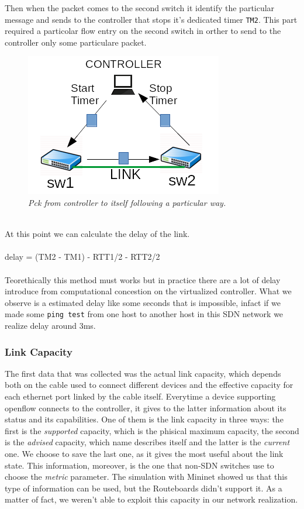 \documentclass[conference,10pt]{IEEEtran}
\begin{document}
Then when the packet comes to the second switch it identify the particular message and sends to the controller that stops it's dedicated timer \texttt{TM2}.
\newline This part required a particolar flow entry on the second switch in orther to send to the controller only some particulare packet.
\begin{figure}[!h]
 \centering
 \includegraphics[scale=0.70]{images/rtt1.png}
 \caption{\emph{Pck from controller to itself following a particular way.}}
 \label{fig:topo}
\end{figure}
\\
\newline At this point we can calculate the delay of the link.
\\
\\
 delay = (TM2 - TM1) - RTT1/2 - RTT2/2
\\
\\
Teorethically this method must works but in practice there are a lot of delay introduce from computational concestion on the virtualized controller.
What we observe is a estimated delay like some seconds that is impossible, infact if we made some \texttt{ping test} from one host to another host
in this SDN network we realize delay around 3ms.
\\

		\subsubsection{Link Capacity}
	The first data that was collected was the actual link capacity, which depends both on the cable used to connect
	different devices and the effective capacity for each ethernet port linked by the cable itself. Everytime a device supporting
	openflow connects to the controller, it gives to the latter information about its status and its capabilities. One of them is
	the link capacity in three ways: the first is the \textit{supported} capacity, which is the phisical maximum capacity, the second is the
	\textit{advised} capacity, which name describes itself and the latter is the \textit{current} one. We choose to save the last one,
	as it gives the most useful about the link state. This information, moreover, is the one that non-SDN switches use to choose the \textit{metric}
	parameter. The simulation with Mininet showed us that this type of information can be used, but the Routeboards didn't support it.
	As a matter of fact, we weren't able to exploit this capacity in our network realization.
		\\
		\\
\end{document}
